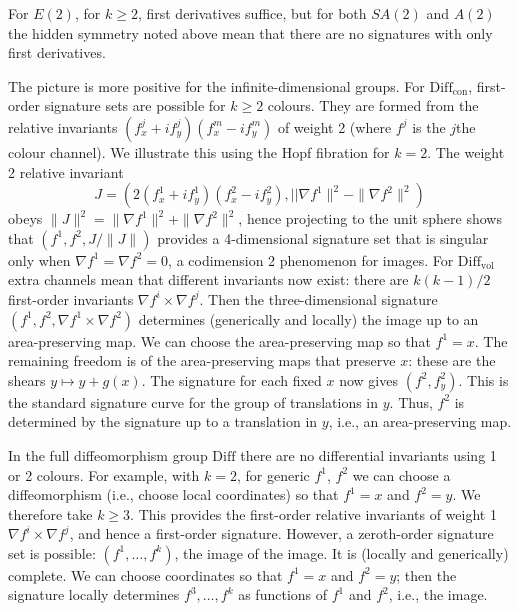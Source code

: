 \documentclass[review,onefignum,onetabnum]{siamonline190516}
\begin{document}
For $E(2)$, for $k\ge 2$, first derivatives suffice, but for both $SA(2)$ and $A(2)$ the hidden symmetry noted above mean that there are no signatures with only first derivatives. 

The picture is more positive for the infinite-dimensional groups.  For $\mathrm{Diff}_{\mathrm{con}}$, first-order signature sets are possible for $k \ge 2$ colours. They are formed from the relative invariants $(f^j_x + i f^j_y)(f^m_x - i f^m_y)$ of weight 2 (where $f^j$ is the $j$the colour channel). We illustrate this using the Hopf fibration for $k=2$. The weight 2 relative invariant $$J = (2(f^1_x + i f^1_y)(f^2_x - i f^2_y), ||\nabla f^1\|^2 - \|\nabla f^2\|^2)$$ obeys $\|J\|^2 = \|\nabla f^1\|^2 + \|\nabla f^2\|^2$, hence projecting to the unit sphere shows that $(f^1,f^2,J/\|J\|)$ provides a 4-dimensional signature set that is singular only when $\nabla f^1 = \nabla f^2 = 0$, a codimension 2 phenomenon for images. For $\mathrm{Diff}_{\mathrm{vol}}$ extra channels mean that different invariants now exist: there are $k(k-1)/2$ first-order invariants $ \nabla f^i \times \nabla f^j$. Then the three-dimensional signature $ (f^1,f^2, \nabla f^1 \times \nabla f^2)$ determines (generically and locally) the image up to an area-preserving map. We can choose the area-preserving map so that $f^1=x$. The remaining freedom is of the area-preserving maps that preserve $x$: these are the shears $y\mapsto y + g(x)$. The signature for each fixed $x$ now gives $(f^2,f^2_y)$. This is the standard signature curve for the group of translations in $y$. Thus, $f^2$ is determined by the signature up to a translation in $y$, i.e., an area-preserving map.

In the full diffeomorphism group $\mathrm{Diff}$ there are no differential invariants using 1 or 2 colours. For example, with $k=2$, for generic $f^1$, $f^2$ we can choose a diffeomorphism (i.e., choose local coordinates) so that $f^1=x$ and $f^2=y$. We therefore take $k\ge 3$. This provides the first-order relative invariants of weight 1 $\nabla f^i\times \nabla f^j$, and hence a first-order signature. However, a zeroth-order signature set is possible: $(f^1,\dots,f^k)$, the image of the image. It is (locally and generically) complete. We can choose coordinates so that $f^1=x$ and $f^2=y$; then the signature locally determines $f^3,\dots,f^k$ as functions of $f^1$ and $f^2$, i.e., the image.

\end{document}
